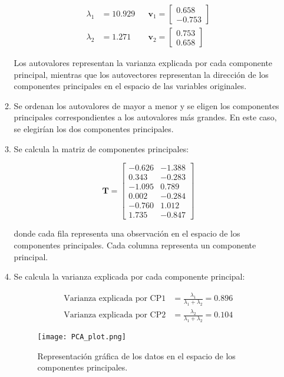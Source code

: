 \documentclass{article}
\begin{document}
\begin{itemize}
\begin{enumerate}
\begin{align*}
    \lambda_1 &= 10.929 && \mathbf{v}_1 = \begin{bmatrix}
    0.658 \\
    -0.753
    \end{bmatrix} \\
    \lambda_2 &= 1.271 && \mathbf{v}_2 = \begin{bmatrix}
    0.753 \\
    0.658
    \end{bmatrix}
\end{align*}

Los autovalores representan la varianza explicada por cada componente principal, mientras que los autovectores representan la dirección de los componentes principales en el espacio de las variables originales.

\item Se ordenan los autovalores de mayor a menor y se eligen los componentes principales correspondientes a los autovalores más grandes. En este caso, se elegirían los dos componentes principales.

\item Se calcula la matriz de componentes principales:

\[
\mathbf{T} = \begin{bmatrix}
-0.626 & -1.388 \\
0.343 & -0.283 \\
-1.095 & 0.789 \\
0.002 & -0.284 \\
-0.760 & 1.012 \\
1.735 & -0.847
\end{bmatrix}
\]

donde cada fila representa una observación en el espacio de los componentes principales. Cada columna representa un componente principal.

\item Se calcula la varianza explicada por cada componente principal:

\begin{align*}
    \text{Varianza explicada por CP1} &= \frac{\lambda_1}{\lambda_1 + \lambda_2} = 0.896 \\
    \text{Varianza explicada por CP2} &= \frac{\lambda_2}{\lambda_1 + \lambda_2} = 0.104
\end{align*}

\begin{figure}[h]
  \centering
  \texttt{[image: PCA\_plot.png]}
  \caption{Representación gráfica de los datos en el espacio de los componentes principales.}
  \label{fig:pca-plot}
  \end{figure}
  

\end{enumerate}
\end{itemize}
\end{document}
